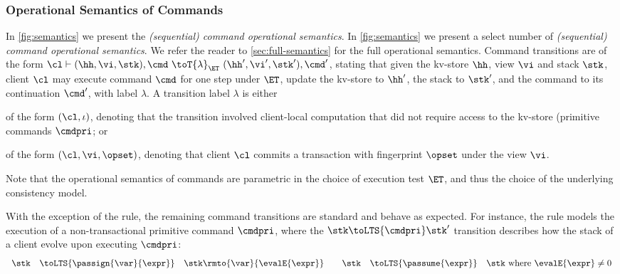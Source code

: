 \subsubsection{Operational Semantics of Commands}
\ifTechReport%
In \cref{fig:semantics} we present the \emph{(sequential) command operational semantics}.
\else%
In \cref{fig:semantics} we present a select number of \emph{(sequential) command operational semantics}.
We refer the reader to \cref{sec:full-semantics} for the full operational semantics.
\fi%
Command transitions are of the form $\cl \vdash (\hh, \vi, \stk), \cmd \ \toT{\lambda}_{\ET} \ (\hh', \vi', \stk') , \cmd'$, 
stating that given the kv-store $\hh$, view $\vi$ and stack $\stk$, client $\cl$ may execute command $\cmd$ for one step under $\ET$, update the kv-store to $\hh'$, the stack to $\stk'$, and the command to its continuation $\cmd'$, with label $\lambda$.
A transition label $\lambda$ is either
\begin{enumerate*}
	\item of the form $(\cl, \iota)$, denoting that the transition involved 
client-local computation that did not require access to the kv-store (\eg primitive commands $\cmdpri$; or
	\item of the form $(\cl, \vi, \opset)$, denoting that client $\cl$ commits a transaction with fingerprint $\opset$ under the view $\vi$.
\end{enumerate*}
Note that the operational semantics of commands are parametric in the choice of execution test $\ET$, 
and thus the choice of the underlying consistency model.


With the exception of the  rule, the remaining command transitions are standard and behave as expected. 
For instance, the  rule models the execution of a non-transactional primitive command $\cmdpri$, where the $\stk \toLTS{\cmdpri} \stk'$ transition describes how the stack of a client 
evolve upon executing $\cmdpri$:
\[
\begin{array}{rcl @{\qquad} rcl}
\stk  & \toLTS{\passign{\var}{\expr}} & \stk\rmto{\var}{\evalE{\expr}} &
\stk  & \toLTS{\passume{\expr}} & \stk \text{ where } \evalE{\expr} \neq 0 \\
\end{array}                                                                                               
\]
%
%
%


